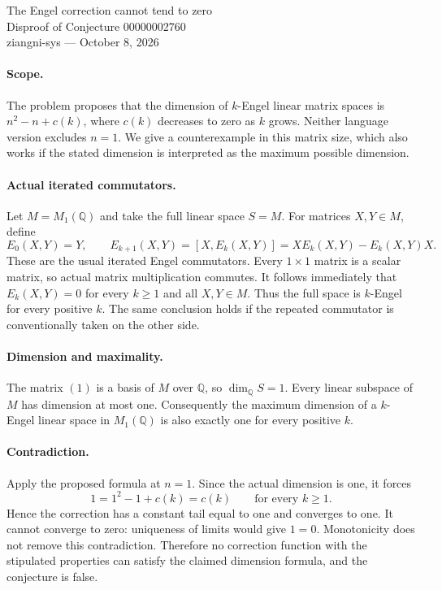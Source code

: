 \documentclass[11pt]{article}
\begin{document}
\begin{center}
{\Large The Engel correction cannot tend to zero}\\[4pt]
Disproof of Conjecture 00000002760\\[4pt]
ziangni-sys --- October 8, 2026
\end{center}
\paragraph{Scope.}
The problem proposes that the dimension of $k$-Engel linear matrix
spaces is $n^2-n+c(k)$, where $c(k)$ decreases to zero as $k$ grows.
Neither language version excludes $n=1$. We give a counterexample
in this matrix size, which also works if the stated dimension is
interpreted as the maximum possible dimension.

\paragraph{Actual iterated commutators.}
Let $M=M_1(\mathbb Q)$ and take the full linear space $S=M$.
For matrices $X,Y\in M$, define
\[
 E_0(X,Y)=Y,\qquad
 E_{k+1}(X,Y)=[X,E_k(X,Y)]
             =XE_k(X,Y)-E_k(X,Y)X.
\]
These are the usual iterated Engel commutators. Every $1\times1$
matrix is a scalar matrix, so actual matrix multiplication commutes.
It follows immediately that $E_k(X,Y)=0$ for every $k\geq1$ and
all $X,Y\in M$. Thus the full space is $k$-Engel for every positive
$k$. The same conclusion holds if the repeated commutator is
conventionally taken on the other side.

\paragraph{Dimension and maximality.}
The matrix $(1)$ is a basis of $M$ over $\mathbb Q$, so
$\dim_{\mathbb Q}S=1$. Every linear subspace of $M$ has dimension
at most one. Consequently the maximum dimension of a $k$-Engel
linear space in $M_1(\mathbb Q)$ is also exactly one for every
positive $k$.

\paragraph{Contradiction.}
Apply the proposed formula at $n=1$. Since the actual dimension is
one, it forces
\[
 1=1^2-1+c(k)=c(k)\qquad\text{for every }k\geq1.
\]
Hence the correction has a constant tail equal to one and converges
to one. It cannot converge to zero: uniqueness of limits would give
$1=0$. Monotonicity does not remove this contradiction. Therefore
no correction function with the stipulated properties can satisfy
the claimed dimension formula, and the conjecture is false.
\end{document}
